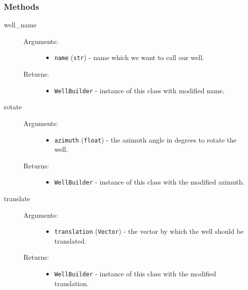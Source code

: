 \documentclass[english,10pt,a4paper]{article}
\begin{document}
	\subsubsection{Methods}
	\begin{description}

		\item[ \colorbox{gray!20}{well\_name}] \hfill
		\begin{description}
			\item[Arguments:] \hfill
			\begin{itemize}
				\item \texttt{name} (\texttt{str}) - name which we want to call our well.
			\end{itemize}
			\item[Returns:] \hfill
			\begin{itemize}
				\item \texttt{WellBuilder} - instance of this class with modified name.
			\end{itemize}
		\end{description}

		\item[ \colorbox{gray!20}{rotate}] \hfill
		\begin{description}
			\item[Arguments:] \hfill
			\begin{itemize}
				\item \texttt{azimuth} (\texttt{float}) - the azimuth angle in degrees to rotate the well.
			\end{itemize}
			\item[Returns:] \hfill
			\begin{itemize}
				\item \texttt{WellBuilder} - instance of this class with the modified azimuth.
			\end{itemize}
		\end{description}

		\item[ \colorbox{gray!20}{translate}] \hfill
		\begin{description}
			\item[Arguments:] \hfill
			\begin{itemize}
				\item \texttt{translation} (\texttt{Vector}) - the vector by which the well should be translated.
			\end{itemize}
			\item[Returns:] \hfill
			\begin{itemize}
				\item \texttt{WellBuilder} - instance of this class with the modified translation.
			\end{itemize}
		\end{description}


\end{description}
\end{document}
